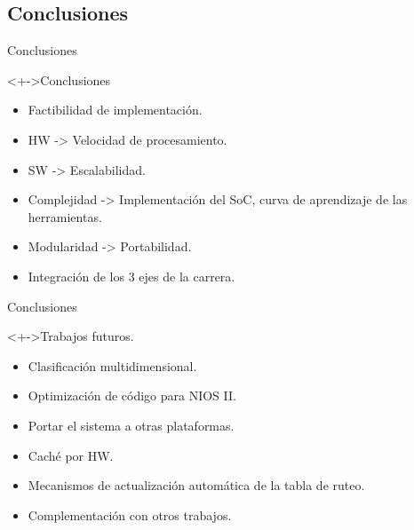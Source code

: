 \documentclass[xcolor=dvipsnames]{beamer}
\begin{document}
\subsection{Conclusiones}
\begin{frame}{Conclusiones} 
\begin{block}<+->{Conclusiones}   
    \begin{itemize}
      \scriptsize
     	\item Factibilidad de implementación.
     	\item HW -> Velocidad de procesamiento.
     	\item SW -> Escalabilidad.
     	\item Complejidad -> Implementación del SoC, curva de aprendizaje de las herramientas.
     	\item Modularidad -> Portabilidad.
     	\item Integración de los 3 ejes de la carrera.      	
    \end{itemize}
  \end{block}
\end{frame}
\begin{frame}{Conclusiones}
  \begin{block}<+->{Trabajos futuros.}   
    \begin{itemize}
      \scriptsize
     	\item Clasificación multidimensional.
     	\item Optimización de código para NIOS II.
     	\item Portar el sistema a otras plataformas.
     	\item Caché por HW.
     	\item Mecanismos de actualización automática de la tabla de ruteo.
     	\item Complementación con otros trabajos.     	
    \end{itemize}
  \end{block}
\end{frame}
\end{document}
